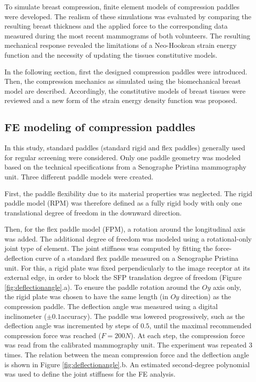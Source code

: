 To simulate breast compression, finite element models of compression paddles were developed. The realism of these simulations was evaluated by comparing the resulting breast thickness and the applied force to the corresponding data measured during the most recent mammograms of both volunteers. The resulting mechanical response revealed the limitations of a Neo-Hookean strain energy function and the necessity of updating  the tissues constitutive models. 

In the following section, first the designed compression paddles were introduced. Then, the compression mechanics as simulated using the biomechanical breast model are described. Accordingly,  the constitutive models of breast tissues were reviewed and a new form of the strain energy density function was proposed.  

\subsection{FE modeling of compression paddles}
In this study, standard paddles (standard rigid and flex paddles) generally used for regular screening were considered. Only one paddle geometry was modeled based on the technical specifications from a Senographe Pristina mammography unit. Three different paddle models were created.  

First, the paddle flexibility due to its material properties was neglected. The rigid paddle model (RPM) was therefore defined as a fully rigid body with only one translational degree of freedom in the downward direction. 

Then, for the flex paddle model (FPM), a rotation around the longitudinal axis was added. The additional degree of freedom was modeled using a rotational-only joint type of element. The joint stiffness was computed by fitting the force-deflection curve of a standard flex paddle measured on a Senographe Pristina unit. For this, a rigid plate was fixed perpendicularly to the image receptor at its external edge, in order to block the SFP translation degree of freedom (Figure \ref{fig:deflectionangle}.a). To ensure the paddle rotation around the $Oy$ axis only, the rigid plate was chosen to have the same length (in $Oy$ direction) as the compression paddle. The deflection angle was measured using a digital inclinometer ($\pm0.1$\textdegree  accuracy). The paddle was lowered progressively, such as the deflection angle was incremented by steps of $0.5$\textdegree, until the maximal recommended compression force was reached ($F=200N$). At each step, the compression force was read from the calibrated mammography unit. The experiment was repeated 3 times. The relation between the mean compression force and the deflection angle is shown in Figure \ref{fig:deflectionangle}.b. An estimated second-degree polynomial was used to define the joint stiffness for the FE analysis.


